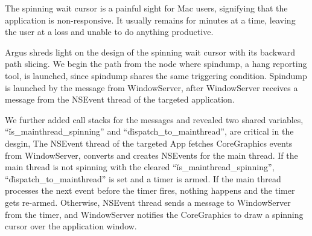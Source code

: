 The spinning wait cursor is a painful sight for Mac users, signifying that the application is non-responsive.
It usually remains for minutes at a time, leaving the user at a loss and unable to do anything productive.

Argus shreds light on the design of the spinning wait cursor with its backward path slicing.
We begin the path from the node where spindump, a hang reporting tool, is launched,
since spindump shares the same triggering condition.
Spindump is launched by the message from WindowServer, after WindowServer receives a message from the NSEvent thread of the targeted application.

We further added call stacks for the messages and revealed two shared variables, ``\v{is\_mainthread\_spinning}'' and ``\v{dispatch\_to\_mainthread}'', are critical in the desgin,
The NSEvent thread of the targeted App fetches CoreGraphics events from WindowServer, converts and creates NSEvents for the main thread.
If the main thread is not spinning with the cleared ``\v{is\_mainthread\_spinning}'', ``\v{dispatch\_to\_mainthread}'' is set and a timer is armed.
If the main thread processes the next event before the timer fires, nothing happens and the timer gets re-armed.
Otherwise, NSEvent thread sends a message to WindowServer from the timer,
and WindowServer notifies the CoreGraphics to draw a spinning cursor over the application window.

